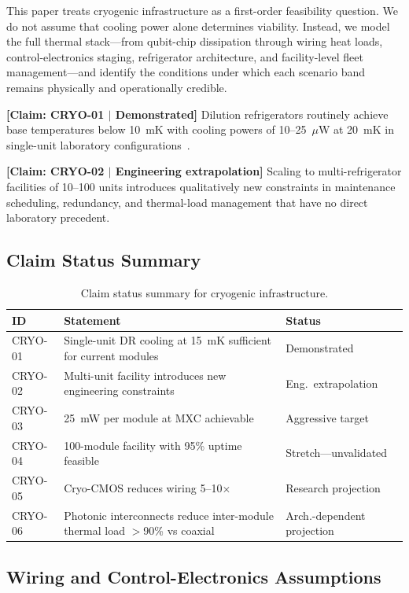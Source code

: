 \documentclass[conference]{IEEEtran}
\begin{document}
This paper treats cryogenic infrastructure as a first-order feasibility question. We do not assume that cooling power alone determines viability. Instead, we model the full thermal stack---from qubit-chip dissipation through wiring heat loads, control-electronics staging, refrigerator architecture, and facility-level fleet management---and identify the conditions under which each scenario band remains physically and operationally credible.

\textbf{[Claim: CRYO-01 $|$ Demonstrated]} Dilution refrigerators routinely achieve base temperatures below 10~mK with cooling powers of 10--25~$\mu$W at 20~mK in single-unit laboratory configurations~\cite{Krinner2019}.

\textbf{[Claim: CRYO-02 $|$ Engineering extrapolation]} Scaling to multi-refrigerator facilities of 10--100 units introduces qualitatively new constraints in maintenance scheduling, redundancy, and thermal-load management that have no direct laboratory precedent.

\subsection{Claim Status Summary}

\begin{table}[H]
\centering
\caption{Claim status summary for cryogenic infrastructure.}
\label{tab:claim-summary}
\footnotesize
\begin{tabularx}{\columnwidth}{lL{3.0cm}L{2.5cm}}
\toprule
\textbf{ID} & \textbf{Statement} & \textbf{Status} \\
\midrule
CRYO-01 & Single-unit DR cooling at 15~mK sufficient for current modules & Demonstrated \\
CRYO-02 & Multi-unit facility introduces new engineering constraints & Eng.\ extrapolation \\
CRYO-03 & 25~mW per module at MXC achievable & Aggressive target \\
CRYO-04 & 100-module facility with 95\% uptime feasible & Stretch---unvalidated \\
CRYO-05 & Cryo-CMOS reduces wiring 5--10$\times$ & Research projection \\
CRYO-06 & Photonic interconnects reduce inter-module thermal load $>$90\% vs coaxial & Arch.-dependent projection \\
\bottomrule
\end{tabularx}
\end{table}

\subsection{Wiring and Control-Electronics Assumptions}
\end{document}
